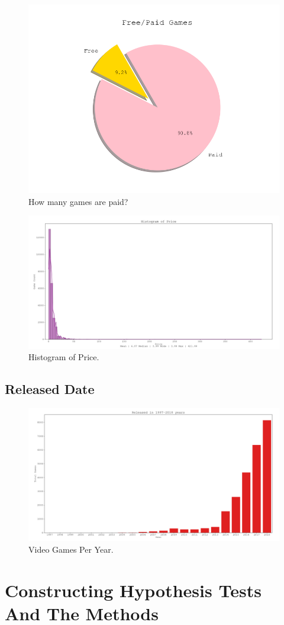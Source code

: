 \documentclass[conference]{IEEEtran}
\begin{document}
\begin{figure}[h]
  \includegraphics[width=\linewidth]{assets/price_free_paid_pie.png}
  \caption{How many games are paid?}
  \label{fig:price1}
\end{figure}

\begin{figure}[h]
  \includegraphics[width=\linewidth]{assets/price_hist.png}
  \caption{Histogram of Price.}
  \label{fig:price2}
\end{figure}

\subsection{Released Date}


\begin{figure}[h]
  \includegraphics[width=\linewidth]{assets/released_date_bar.png}
  \caption{Video Games Per Year.}
  \label{fig:releaseddate1}
\end{figure}


\section{Constructing Hypothesis Tests And The
Methods}
\end{document}
